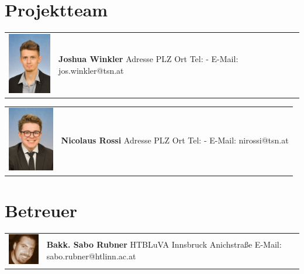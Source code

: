 \section*{Projektteam}

\begin{tabular}[t]{p{2cm} p{5cm}}
    \vspace{0pt}
    \includegraphics[width=2cm]{../images/joshua.jpg}
    &
    \vspace{0pt}
    \textbf{Joshua Winkler} 
    \newline Adresse
    \newline PLZ Ort
    \newline
    \newline Tel: -
    \newline E-Mail: jos.winkler@tsn.at
    \\
\end{tabular}

\begin{tabular}[t]{p{2cm} p{5cm}}
    \vspace{0pt}
    \includegraphics[width=2cm]{../images/nicolaus.jpg}
    &
    \vspace{0pt}
    \textbf{Nicolaus Rossi}
    \newline Adresse
    \newline PLZ Ort
    \newline
    \newline Tel: -
    \newline E-Mail: nirossi@tsn.at
    \\
\end{tabular}

\section*{Betreuer}

\begin{tabular}[t]{p{2cm} p{7cm}}
    \vspace{0pt}
    \includegraphics[width=2cm]{../images/sabo.jpg}
    &
    \vspace{0pt}
    \textbf{Bakk. Sabo Rubner}
    \newline HTBLuVA Innsbruck Anichstraße
    \newline
    \newline E-Mail: sabo.rubner@htlinn.ac.at
    \\
\end{tabular}

\newpage